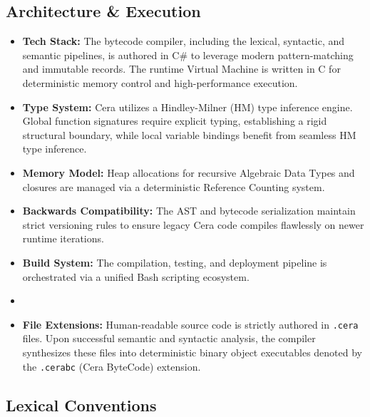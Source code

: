\documentclass[11pt, a4paper]{article}
\begin{document}
\subsection{Architecture \& Execution}

\begin{itemize}
    \item \textbf{Tech Stack:} The bytecode compiler, including the lexical, syntactic, and semantic pipelines, is authored in C\# to leverage modern pattern-matching and immutable records. The runtime Virtual Machine is written in C for deterministic memory control and high-performance execution.
    \item \textbf{Type System:} Cera utilizes a Hindley-Milner (HM) type inference engine. Global function signatures require explicit typing, establishing a rigid structural boundary, while local variable bindings benefit from seamless HM type inference.
    \item \textbf{Memory Model:} Heap allocations for recursive Algebraic Data Types and closures are managed via a deterministic Reference Counting system.
    \item \textbf{Backwards Compatibility:} The AST and bytecode serialization maintain strict versioning rules to ensure legacy Cera code compiles flawlessly on newer runtime iterations.
    \item \textbf{Build System:} The compilation, testing, and deployment pipeline is orchestrated via a unified Bash scripting ecosystem.
    \item \item \textbf{File Extensions:} Human-readable source code is strictly authored in \texttt{.cera} files. Upon successful semantic and syntactic analysis, the compiler synthesizes these files into deterministic binary object executables denoted by the \texttt{.cerabc} (Cera ByteCode) extension. 
\end{itemize}

\subsection{Lexical Conventions}
\end{document}
